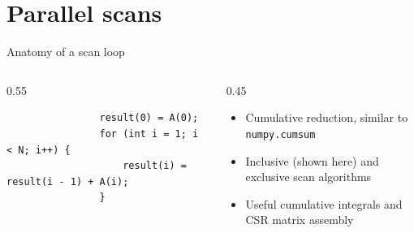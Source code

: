\documentclass[
    aspectratio=169,
    \createHandout
]{beamer}
\begin{document}

\section{Parallel scans}

\begin{frame}[fragile]{Anatomy of a scan loop}
    \begin{columns}
        \begin{column}{0.55\linewidth}
            \begin{verbatim}
                result(0) = A(0);
                for (int i = 1; i < N; i++) {
                    result(i) = result(i - 1) + A(i);
                }
            \end{verbatim}
        \end{column}
        \begin{column}{0.45\linewidth}
            \begin{itemize}
                \item Cumulative reduction, similar to \texttt{numpy.cumsum}
                \item Inclusive (shown here) and exclusive scan algorithms
                \item Useful cumulative integrals and CSR matrix assembly
            \end{itemize}
        \end{column}
    \end{columns}
\end{frame}
\end{document}
